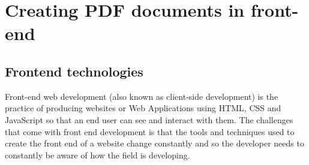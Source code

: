 \documentclass[paper.tex]{subfiles}
\begin{document}
\chapter{Creating PDF documents in front-end}

\section{Frontend technologies}
\par
Front-end web development (also known as client-side development) is the practice of producing websites or Web Applications using HTML, CSS and JavaScript so that an end user can see and interact with them. The challenges that come with front end development is that the tools and techniques used to create the front end of a website change constantly and so the developer needs to constantly be aware of how the field is developing.
\end{document}
